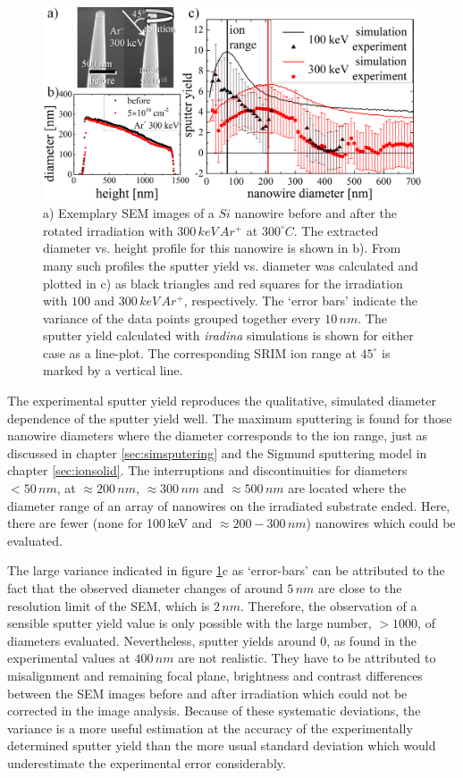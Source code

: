 \begin{figure}[th]
	\centering
		\includegraphics[width=.95\textwidth]{images/sputter_exp.png}
	\caption{a) Exemplary SEM images of a $Si$ nanowire before and after the rotated irradiation with $300\,keV\,Ar^+$ at $300^\circ C$. The extracted diameter vs. height profile for this nanowire is shown in b). From many such profiles the sputter yield vs. diameter was calculated and plotted in c) as black triangles and red squares for the irradiation with $100$ and $300\,keV\,Ar^+$, respectively. The `error bars' indicate the variance of the data points grouped together every $10\,nm$. The sputter yield calculated with \emph{iradina} simulations is shown for either case as a line-plot. The corresponding SRIM ion range at $45^\circ$ is marked by a vertical line.} 
	\label{sputtering_exp}
\end{figure} 

The experimental sputter yield reproduces the qualitative, simulated diameter dependence of the sputter yield well. The maximum sputtering is found for those nanowire diameters where the diameter corresponds to the ion range, just as discussed in chapter \ref{sec:simsputering} and the Sigmund sputtering model in chapter \ref{sec:ionsolid}. The interruptions and discontinuities for diameters $<50\,nm$, at $\approx 200\,nm$, $\approx 300\,nm$ and $\approx 500\,nm$ are located where the diameter range of an array of nanowires on the irradiated substrate ended. Here, there are fewer (none for 100\,keV and $\approx 200 - 300\,nm$) nanowires which could be evaluated.

The large variance indicated in figure \ref{sputtering_exp}c as `error-bars' can be attributed to the fact that the observed diameter changes of around $5\,nm$ are close to the resolution limit of the SEM, which is $2\,nm$. Therefore, the observation of a sensible sputter yield value is only possible with the large number, $>1000$, of diameters evaluated. Nevertheless, sputter yields around 0, as found in the experimental values at $400\,nm$ are not realistic. They have to be attributed to misalignment and remaining focal plane, brightness and contrast differences between the SEM images before and after irradiation which could not be corrected in the image analysis. Because of these systematic deviations, the variance is a more useful estimation at the accuracy of the experimentally determined sputter yield than the more usual standard deviation which would underestimate the experimental error considerably.



